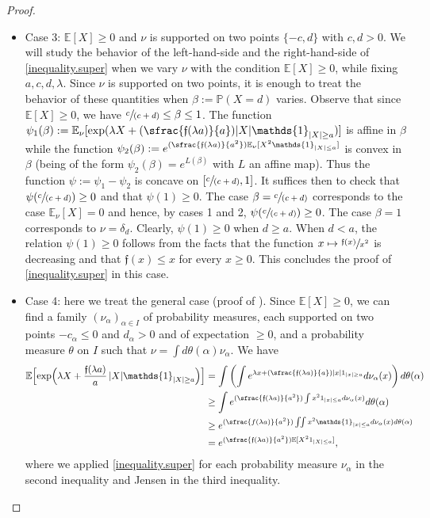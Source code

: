 \documentclass[10pt]{amsart}
\newcommand\mto{\mathchoice{\longmapsto}{\mapsto}{\mapsto}{\mapsto}}
\newcommand{\spfrac}[2]{\sfrac{#1}{(#2)}}
\newcommand{\Psfrac}[2]{(\sfrac{#1}{#2})}
\theoremstyle{plain}
\theoremstyle{definition}
\newcommand\E{\mathbb{E}}
\newcommand\p{\mathbb{P}}
\begin{document}
\begin{proof}
\begin{itemize}
\item Case 3: $\E[X]\geq 0$ and $\nu$ is supported on two points $\{-c,d\}$ with $c,d>0$. We will study the behavior of the left-hand-side and the right-hand-side of \eqref{inequality.super} when we vary $\nu$ with the condition $\E[X]\geq 0$, while fixing $a,c,d,\lambda$. Since $\nu$ is supported on two points, it is enough to treat the behavior of these quantities when
$\beta:=\p(X=d)$ varies. Observe that since $\E[X]\geq 0$, we have $ \spfrac{c}{c+d}\leq \beta \leq 1$. The function
$\psi_1(\beta):=\E_{\nu}[\exp(\lambda X + \Psfrac{\mathfrak{f}(\lambda a)}{a} |X| \mathds{1}_{|X|\geq a})]$ is affine in $\beta$ while the function $\psi_2(\beta):= e^{\Psfrac{\mathfrak{f}(\lambda a)}{a^2} \E_{\nu}[X^2 \mathds{1}_{|X| \leq a}]}$ is convex in $\beta$ (being of the form $\psi_2(\beta)=e^{L(\beta)}$ with $L$ an affine map). Thus the function $\psi:=\psi_1-\psi_2$ is concave on $[\spfrac{c}{c+d}, 1]$. It suffices then to check that $\psi(\spfrac{c}{c+d})\geq 0$ and that $\psi(1)\geq 0$. The case $\beta=\spfrac{c}{c+d}$ corresponds to the case $\E_{\nu}[X]=0$ and hence, by cases 1 and 2, $\psi(\spfrac{c}{c+d})\geq 0$.
The case $\beta=1$ corresponds to $\nu=\delta_d$. Clearly, $\psi(1)\geq 0$ when $d\geq a$. When $d<a$, the relation $\psi(1)\geq 0$ follows from the facts that the function $x\mto \sfrac{\mathfrak{f}(x)}{x^2}$ is decreasing and that $\mathfrak{f}(x)\leq x$ for every $x\geq 0$. This concludes the proof of \eqref{inequality.super} in this case.

\item Case 4: here we treat the general case (\cf proof of \cite[Prop.\,3.6]{Freedman}). Since $\E[X]\geq 0$, we can find a family $(\nu_{\alpha})_{\alpha \in I}$ of probability measures, each supported on two points $-c_{\alpha}\leq 0$ and $d_{\alpha}>0$ and of expectation $\geq 0$, and a probability measure $\theta$ on $I$ such that $\nu=\int{d\theta(\alpha) \nu_{\alpha}}$. We have
\begin{equation*}
\begin{aligned}
\E\Bigl[\exp\Bigl(\lambda X + \frac{\mathfrak{f}(\lambda a)}{a}\, |X| \mathds{1}_{|X|\geq a}\Bigr)\Bigr]&=\int
\left(\int e^{\lambda x +\Psfrac{\mathfrak{f}(\lambda a)}{a}|x| 1_{|x| \geq a}}d\nu_\alpha(x)\right)d\theta(\alpha) \\
&\geq \int e^{\Psfrac{\mathfrak{f}(\lambda a)}{a^2} \int x^2 1_{|x| \leq a} d\nu_\alpha(x)}d\theta(\alpha) \\
& \geq e^{\Psfrac{f(\lambda a)}{a^2} \iint{x^2 \mathds{1}_{|x|\leq a} d\nu_{\alpha}(x) d\theta(\alpha)}}\\
&= e^{\Psfrac{\mathfrak{f}(\lambda a)}{a^2} \mathbb{E}[X^2 1_{|X| \leq a}]},
\end{aligned}
\end{equation*}
where we applied \eqref{inequality.super} for each probability measure $\nu_{\alpha}$ in the second inequality and Jensen in the third inequality.\qedhere
\end{itemize}
\end{proof}
\end{document}
